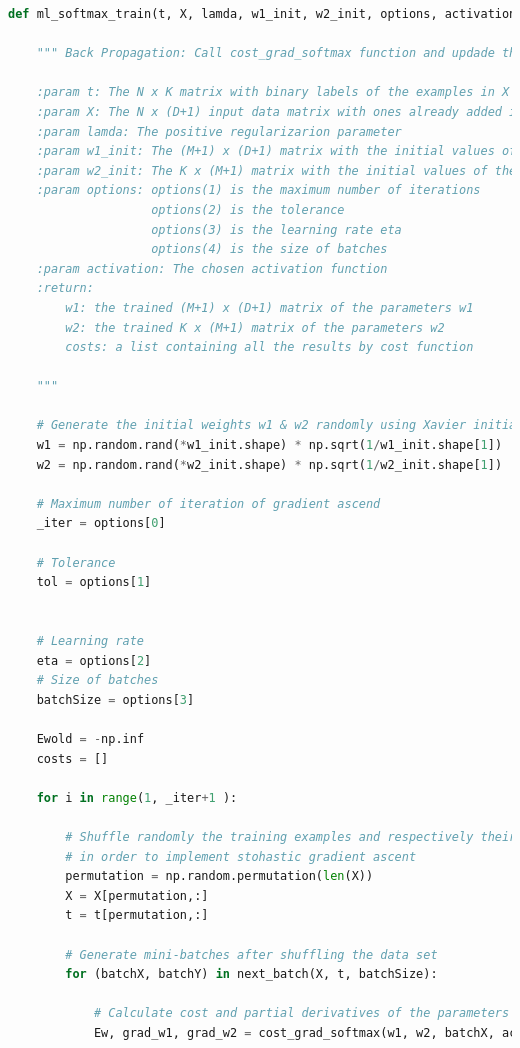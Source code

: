 \documentclass[11pt]{article}
\begin{document}
\begin{lstlisting}[language = Python]
def ml_softmax_train(t, X, lamda, w1_init, w2_init, options, activation):
        
    """ Back Propagation: Call cost_grad_softmax function and updade the values of weights. 
    
    :param t: The N x K matrix with binary labels of the examples in X indicating the 10 categories
    :param X: The N x (D+1) input data matrix with ones already added in the first column
    :param lamda: The positive regularizarion parameter
    :param w1_init: The (M+1) x (D+1) matrix with the initial values of the parameters w1
    :param w2_init: The K x (M+1) matrix with the initial values of the parameters w2
    :param options: options(1) is the maximum number of iterations
                    options(2) is the tolerance
                    options(3) is the learning rate eta
                    options(4) is the size of batches
    :param activation: The chosen activation function
    :return:
        w1: the trained (M+1) x (D+1) matrix of the parameters w1
        w2: the trained K x (M+1) matrix of the parameters w2 
        costs: a list containing all the results by cost function 
        
    """

    # Generate the initial weights w1 & w2 randomly using Xavier initialization method
    w1 = np.random.rand(*w1_init.shape) * np.sqrt(1/w1_init.shape[1])
    w2 = np.random.rand(*w2_init.shape) * np.sqrt(1/w2_init.shape[1])

    # Maximum number of iteration of gradient ascend
    _iter = options[0]

    # Tolerance
    tol = options[1]


    # Learning rate
    eta = options[2]
    # Size of batches
    batchSize = options[3]

    Ewold = -np.inf
    costs = []
    
    for i in range(1, _iter+1 ):
        
        # Shuffle randomly the training examples and respectively their labels on each iteration,
        # in order to implement stohastic gradient ascent
        permutation = np.random.permutation(len(X))
        X = X[permutation,:]
        t = t[permutation,:]
        
        # Generate mini-batches after shuffling the data set
        for (batchX, batchY) in next_batch(X, t, batchSize):
        
            # Calculate cost and partial derivatives of the parameters w1 & w2 for each mini-batch and iteration
            Ew, grad_w1, grad_w2 = cost_grad_softmax(w1, w2, batchX, activation, batchY, lamda)
            

\end{lstlisting}
\end{document}
